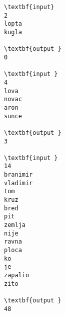 \begin{verbatim}
\textbf{input}  
2 
lopta 
kugla 
 
\textbf{output }
0

\textbf{input } 
4 
lova 
novac 
aron 
sunce 
 
\textbf{output }
3

\textbf{input } 
14 
branimir 
vladimir 
tom 
kruz 
bred 
pit 
zemlja 
nije 
ravna 
ploca 
ko 
je 
zapalio 
zito 
 
\textbf{output } 
48
\end{verbatim}